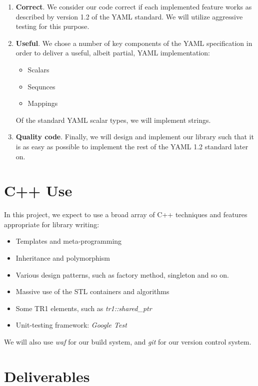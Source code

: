 \documentclass{article}
\begin{document}
\begin{enumerate}
  \item \textbf{Correct}.  We consider our code correct if each implemented feature works as described by version 1.2 of the YAML standard.  We will utilize aggressive testing for this purpose.
  \item \textbf{Useful}.  We chose a number of key components of the YAML specification in order to deliver a useful, albeit partial, YAML implementation:
    \begin{itemize}
      \item Scalars
      \item Sequnces
      \item Mappings
    \end{itemize}
    Of the standard YAML scalar types, we will implement strings.
  \item \textbf{Quality code}.  Finally, we will design and implement our library such that it is as easy as possible to implement the rest of the YAML 1.2 standard later on.
\end{enumerate}

\section{C++ Use}

In this project, we expect to use a broad array of C++ techniques and features appropriate for library writing:

\begin{itemize}
  \item Templates and meta-programming
  \item Inheritance and polymorphism
  \item Various design patterns, such as factory method, singleton and so on.
  \item Massive use of the STL containers and algorithms
  \item Some TR1 elements, such as \emph{tr1::shared\_ptr}
  \item Unit-testing framework:  \emph{Google Test}
\end{itemize}

We will also use \emph{waf} for our build system, and \emph{git} for our version control system.

\section{Deliverables}
\end{document}
